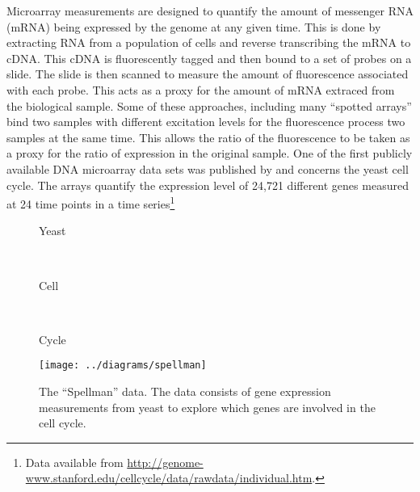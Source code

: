 Microarray measurements are designed to quantify the amount of
messenger RNA (mRNA) being expressed by the genome at any given
time. This is done by extracting RNA from a population of cells and
reverse transcribing the mRNA to cDNA. This cDNA is fluorescently
tagged and then bound to a set of probes on a slide. The slide is then
scanned to measure the amount of fluorescence associated with each
probe. This acts as a proxy for the amount of mRNA extraced from the
biological sample. Some of these approaches, including many ``spotted
arrays'' bind two samples with different excitation levels for the
fluorescence process two samples at the same time. This allows the
ratio of the fluorescence to be taken as a proxy for the ratio of
expression in the original sample. One of the first publicly available
DNA microarray data sets was published by
\citet{Spellman:yeastcellcy98} and concerns the yeast cell cycle. The
arrays quantify the expression level of 24,721 different genes
measured at 24 time points in a time series\footnote{Data available
  from
  \url{http://genome-www.stanford.edu/cellcycle/data/rawdata/individual.htm}.}

% 
\begin{figure}
  \begin{center}
    \begin{minipage}[b][0.8\textheight][t]{0.5\columnwidth}%
      \begin{minipage}[c][0.3\textheight]{1\columnwidth}%
        \begin{center}
          Yeast
          \end{center}%
      \end{minipage}\\
      \begin{minipage}[c][0.3\textheight]{1\columnwidth}%
        \begin{center}
          Cell
          \end{center}%
      \end{minipage}\\
      \begin{minipage}[c][0.3\textheight]{1\columnwidth}%
        \begin{center}
          Cycle
          \end{center}%
      \end{minipage}%
    \end{minipage}\texttt{[image: ../diagrams/spellman]}
  \end{center}

  \caption{The ``Spellman'' data. The data consists of gene expression
    measurements from yeast to explore which genes are involved in the
    cell cycle.}



\end{figure}

